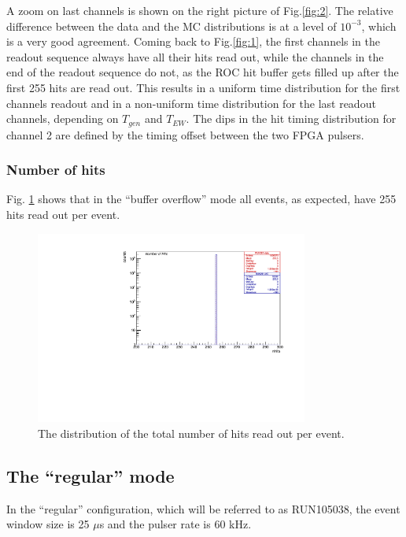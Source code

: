 A zoom on last channels is shown on the right picture of Fig.\ref{fig:2}.
The relative difference between the data and the MC distributions is at a level of $10^{-3}$,
which is a very good agreement.
Coming back to Fig.\ref{fig:1}, the first channels in the readout sequence
always have all their hits read out,
while the channels in the end of the readout sequence do not,
as the ROC hit buffer gets filled up after
the first 255 hits are read out.
This results in a uniform time distribution for the first channels readout and in a non-uniform
time distribution for the last readout channels, depending on $T_{gen}$ and $T_{EW}$.
The dips in the hit timing distribution for channel 2 are defined by the timing offset
between the two FPGA pulsers. 


\subsubsection{Number of hits}
Fig. \ref{fig:3} shows that in the ``buffer overflow'' mode all events,
as expected, have 255 hits read out per event.

\begin{figure}[!h]
\centering
\includegraphics[width =0.8\textwidth]{figures/pdf/figure_00008_nhits_281.pdf}
\caption{
  The distribution of the total number of hits read out per event.
}
\label{fig:3}
\end{figure}
\subsection{The ``regular'' mode }
In the ``regular'' configuration, which will be referred to as RUN105038, the event window size is 25 $\mu$s
and the pulser rate is 60 kHz.

